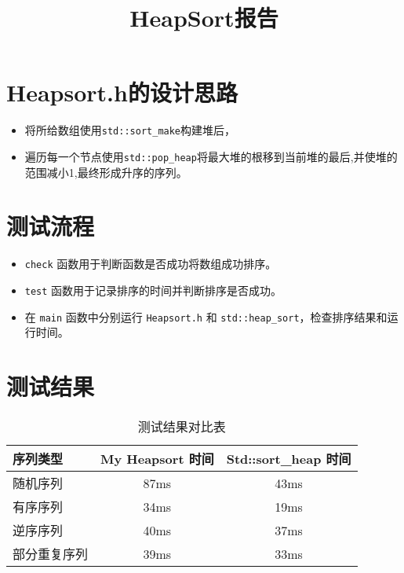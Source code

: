 \documentclass{article}
\title{HeapSort报告}
\author{}
\date{}
\begin{document}
\maketitle
\section{Heapsort.h的设计思路}
\begin{itemize}
    \item 将所给数组使用\texttt{std::sort\_make}构建堆后，
    \item 遍历每一个节点使用\texttt{std::pop\_heap}将最大堆的根移到当前堆的最后,并使堆的范围减小1,最终形成升序的序列。
\end{itemize}
\section{测试流程}
\begin{itemize}
    \item \texttt{check} 函数用于判断函数是否成功将数组成功排序。
    \item \texttt{test} 函数用于记录排序的时间并判断排序是否成功。
    \item 在 \texttt{main} 函数中分别运行 \texttt{Heapsort.h} 和 \texttt{std::heap\_sort}，检查排序结果和运行时间。
\end{itemize}
\section{测试结果}
\begin{table}[h!]
    \centering
    \begin{tabular}{|l|c|c|}
    \hline
    序列类型 & My Heapsort 时间 & Std::sort\_heap 时间 \\
    \hline  
    随机序列 & 87ms & 43ms \\
    \hline 
    有序序列 & 34ms & 19ms \\
    \hline
    逆序序列 & 40ms & 37ms \\
    \hline
    部分重复序列 & 39ms & 33ms \\
    \hline
    \end{tabular}
    \caption{测试结果对比表}
    \end{table}
\end{document}
